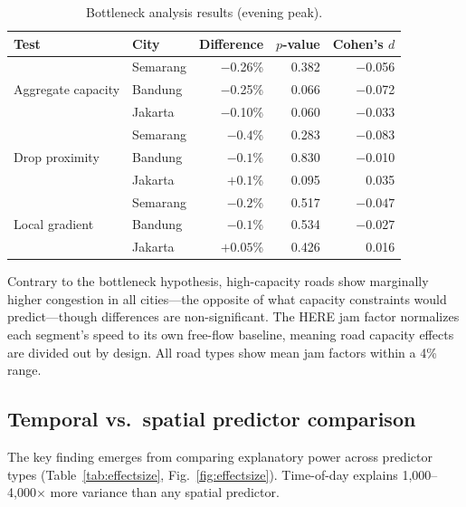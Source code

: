 \documentclass[preprint,12pt,authoryear]{elsarticle}
\begin{document}
\begin{table}[htbp]
\centering
\caption{Bottleneck analysis results (evening peak).}
\label{tab:bottleneck}
\begin{tabular}{llrrr}
\toprule
Test & City & Difference & $p$-value & Cohen's $d$ \\
\midrule
\multirow{3}{*}{Aggregate capacity} & Semarang & $-$0.26\% & 0.382 & $-$0.056 \\
 & Bandung & $-$0.25\% & 0.066 & $-$0.072 \\
 & Jakarta & $-$0.10\% & 0.060 & $-$0.033 \\
\midrule
\multirow{3}{*}{Drop proximity} & Semarang & $-0.4$\% & 0.283 & $-$0.083 \\
 & Bandung & $-0.1$\% & 0.830 & $-$0.010 \\
 & Jakarta & $+0.1$\% & 0.095 & 0.035 \\
\midrule
\multirow{3}{*}{Local gradient} & Semarang & $-0.2$\% & 0.517 & $-0.047$ \\
 & Bandung & $-0.1$\% & 0.534 & $-0.027$ \\
 & Jakarta & $+0.05$\% & 0.426 & 0.016 \\
\bottomrule
\end{tabular}
\end{table}

Contrary to the bottleneck hypothesis, high-capacity roads show marginally higher congestion in all cities---the opposite of what capacity constraints would predict---though differences are non-significant. The HERE jam factor normalizes each segment's speed to its own free-flow baseline, meaning road capacity effects are divided out by design. All road types show mean jam factors within a 4\% range.

\subsection{Temporal vs.\ spatial predictor comparison}

The key finding emerges from comparing explanatory power across predictor types (Table~\ref{tab:effectsize}, Fig.~\ref{fig:effectsize}). Time-of-day explains 1,000--4,000$\times$ more variance than any spatial predictor.
\end{document}
